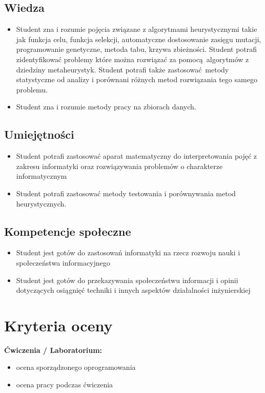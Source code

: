 \documentclass[12pt, a4paper]{article}
\begin{document}
\subsection*{Wiedza}
\begin{itemize}
  \item Student zna i rozumie pojęcia związane z algorytmami heurystycznymi takie jak funkcja celu, funkcja selekcji, automatyczne dostosowanie zasięgu mutacji, programowanie genetyczne, metoda tabu, krzywa zbieżności. Student potrafi zidentyfikować problemy które można rozwiązać za pomocą algorytmów z dziedziny metaheurystyk. Student potrafi także zastosować metody statystyczne od analizy i porównani różnych metod rozwiązania tego samego problemu.
  \item Student zna i rozumie metody pracy na zbiorach danych.
\end{itemize}

\subsection*{Umiejętności}
\begin{itemize}
  \item Student potrafi zastosować aparat matematyczny do interpretowania pojęć z zakresu informatyki oraz rozwiązywania problemów o charakterze informatycznym
  \item Student potrafi  zastosować metody testowania i porównywania metod heurystycznych.
\end{itemize}

\subsection*{Kompetencje społeczne}
\begin{itemize}
  \item Student jest gotów do zastosowań informatyki na rzecz rozwoju nauki i społeczeństwa informacyjnego
  \item Student jest gotów do przekazywania społeczeństwu informacji i opinii dotyczących osiągnięć techniki i innych aspektów działalności inżynierskiej
\end{itemize}

\section{Kryteria oceny}

\textbf{Ćwiczenia / Laboratorium:}
\begin{itemize}
  \item ocena sporządzonego oprogramowania
  \item ocena pracy podczas ćwiczenia
\end{itemize}
\end{document}
